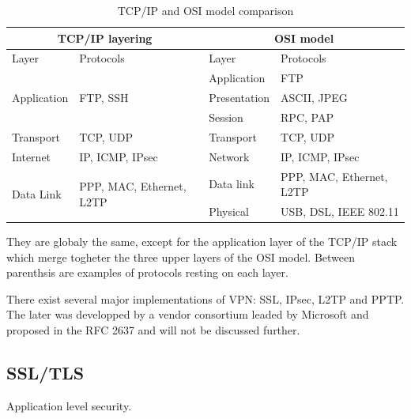 \begin{table}[ht]
\center
\begin{tabularx}{\textwidth}{|l|l|l|X|} \hline
\multicolumn{2}{|c|}{TCP/IP layering} & \multicolumn{2}{c|}{OSI model} \\ \hline
Layer & Protocols & Layer & Protocols \\ \hline
\multirow{3}{*}{Application} & \multirow{3}{*}{FTP, SSH} & Application & FTP \\ \cline{3-4}
 & & Presentation & ASCII, JPEG \\ \cline{3-4}
 & & Session & RPC, PAP \\ \hline
Transport & TCP, UDP & Transport & TCP, UDP \\ \hline
Internet & IP, ICMP, IPsec & Network & IP, ICMP, IPsec \\ \hline
\multirow{2}{*}{Data Link} & \multirow{2}{*}{PPP, MAC, Ethernet, L2TP} & Data link & PPP, MAC, Ethernet, L2TP \\ \cline{3-4}
 & & Physical & USB, DSL, IEEE 802.11 \\ \hline
\end{tabularx}
\caption{TCP/IP and OSI model comparison}{They are globaly the same, except for the application layer of the TCP/IP stack which merge togheter the three upper layers of the OSI model. Between parenthsis are examples of protocols resting on each layer.}
\label{tab:tcp-ip-stack}
\end{table}



There exist several major implementations of VPN: SSL, IPsec, L2TP and PPTP.
The later was developped by a vendor consortium leaded by Microsoft and proposed in the RFC 2637 and will not be discussed further.

\subsection{SSL/TLS}
Application level security.














